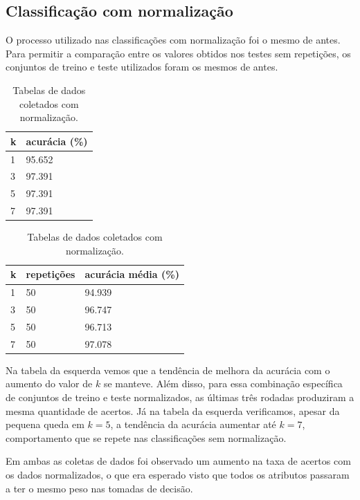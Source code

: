 \documentclass{article}
\begin{document}
\subsection*{Classificação com normalização}

O processo utilizado nas classificações com normalização foi o mesmo de antes. Para permitir a comparação entre os valores obtidos nos testes sem repetições, os conjuntos de treino e teste utilizados foram os mesmos de antes.

\bigskip
\begin{table}[h]
\begin{center}
    \begin{tabular}{ | m{2em} | m{10em} | }
    \hline
    k & acurácia (\%) \\
    \hline
    1 & 95.652 \\
    3 & 97.391 \\
    5 & 97.391 \\
    7 & 97.391 \\
    \hline
    \end{tabular}
    \hspace{20pt}%
    \begin{tabular}{ | m{2em} | m{5em} | m{10em} | }
    \hline
    k & repetições & acurácia média (\%) \\
    \hline
    1 & 50 & 94.939 \\
    3 & 50 & 96.747 \\
    5 & 50 & 96.713 \\
    7 & 50 & 97.078 \\
    \hline
    \end{tabular}
\caption{Tabelas de dados coletados com normalização.}
\end{center}
\end{table}

Na tabela da esquerda vemos que a tendência de melhora da acurácia com o aumento do valor de \(k\) se manteve. Além disso, para essa combinação específica de conjuntos de treino e teste normalizados, as últimas três rodadas produziram a mesma quantidade de acertos. Já na tabela da esquerda verificamos, apesar da pequena queda em \(k = 5\), a tendência da acurácia aumentar até \(k = 7\), comportamento que se repete nas classificações sem normalização.

Em ambas as coletas de dados foi observado um aumento na taxa de acertos com os dados normalizados, o que era esperado visto que todos os atributos passaram a ter o mesmo peso nas tomadas de decisão.
\end{document}
